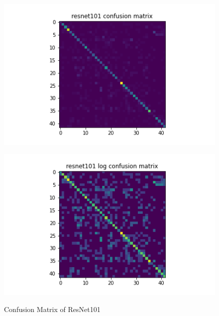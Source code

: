 \begin{figure}[t]
\begin{minipage}[b]{.5\linewidth}
    {\includegraphics[width=1.2\textwidth]{figs/conf_matrix/resnet101_conf.png}}
  \end{minipage}
  \hfill
  \begin{minipage}[b]{.5\linewidth}
    \centering

    {\includegraphics[width=1.2\textwidth]{figs/conf_matrix/resnet101_log_conf.png}}

  \end{minipage}

  \caption{Confusion Matrix of ResNet101}
  \label{fig:resnet101_conf}
  \vspace{0.2in}
\end{figure}

